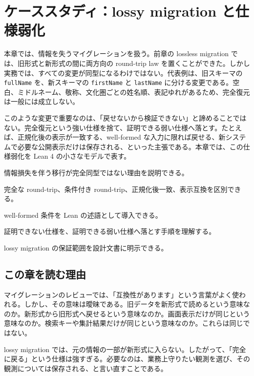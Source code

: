 \chapter{ケーススタディ：lossy migration と仕様弱化}
\label{chap:ch23_lossy_migration}

\begin{chapterabstract}
本章では、情報を失うマイグレーションを扱う。前章の lossless migration では、旧形式と新形式の間に両方向の round-trip law を置くことができた。しかし実務では、すべての変更が同型になるわけではない。代表例は、旧スキーマの \texttt{fullName} を、新スキーマの \texttt{firstName} と \texttt{lastName} に分ける変更である。空白、ミドルネーム、敬称、文化圏ごとの姓名順、表記ゆれがあるため、完全復元は一般には成立しない。

このような変更で重要なのは、「戻せないから検証できない」と諦めることではない。完全復元という強い仕様を捨て、証明できる弱い仕様へ落とす。たとえば、正規化後の表示が一致する、well-formed な入力に限れば戻せる、新システムで必要な公開表示だけは保存される、といった主張である。本章では、この仕様弱化を Lean 4 の小さなモデルで表す。
\end{chapterabstract}

\begin{learninggoals}
\item 情報損失を伴う移行が完全同型ではない理由を説明できる。
\item 完全な round-trip、条件付き round-trip、正規化後一致、表示互換を区別できる。
\item well-formed 条件を Lean の述語として導入できる。
\item 証明できない仕様を、証明できる弱い仕様へ落とす手順を理解する。
\item lossy migration の保証範囲を設計文書に明示できる。
\end{learninggoals}

\section{この章を読む理由}

マイグレーションのレビューでは、「互換性があります」という言葉がよく使われる。しかし、その意味は曖昧である。旧データを新形式で読めるという意味なのか。新形式から旧形式へ戻せるという意味なのか。画面表示だけが同じという意味なのか。検索キーや集計結果だけが同じという意味なのか。これらは同じではない。

\begin{intuitionbox}
lossy migration では、元の情報の一部が新形式に入らない。したがって、「完全に戻る」という仕様は強すぎる。必要なのは、業務上守りたい観測を選び、その観測については保存される、と言い直すことである。
\end{intuitionbox}

